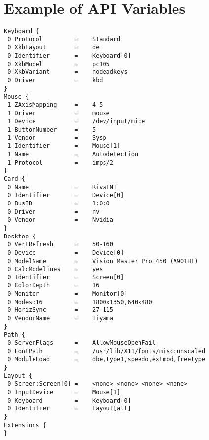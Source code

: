 \section{Example of API Variables}
\begin{small}
\begin{verbatim}
Keyboard {
 0 Protocol         =    Standard
 0 XkbLayout        =    de
 0 Identifier       =    Keyboard[0]
 0 XkbModel         =    pc105
 0 XkbVariant       =    nodeadkeys
 0 Driver           =    kbd
}
Mouse {
 1 ZAxisMapping     =    4 5
 1 Driver           =    mouse
 1 Device           =    /dev/input/mice
 1 ButtonNumber     =    5
 1 Vendor           =    Sysp
 1 Identifier       =    Mouse[1]
 1 Name             =    Autodetection
 1 Protocol         =    imps/2
}
Card {
 0 Name             =    RivaTNT
 0 Identifier       =    Device[0]
 0 BusID            =    1:0:0
 0 Driver           =    nv
 0 Vendor           =    Nvidia
}
Desktop {
 0 VertRefresh      =    50-160
 0 Device           =    Device[0]
 0 ModelName        =    Vision Master Pro 450 (A901HT)
 0 CalcModelines    =    yes
 0 Identifier       =    Screen[0]
 0 ColorDepth       =    16
 0 Monitor          =    Monitor[0]
 0 Modes:16         =    1800x1350,640x480
 0 HorizSync        =    27-115
 0 VendorName       =    Iiyama
}
Path {
 0 ServerFlags      =    AllowMouseOpenFail
 0 FontPath         =    /usr/lib/X11/fonts/misc:unscaled
 0 ModuleLoad       =    dbe,type1,speedo,extmod,freetype
}
Layout {
 0 Screen:Screen[0] =    <none> <none> <none> <none>
 0 InputDevice      =    Mouse[1]
 0 Keyboard         =    Keyboard[0]
 0 Identifier       =    Layout[all]
}
Extensions {
}
\end{verbatim}
\end{small}
